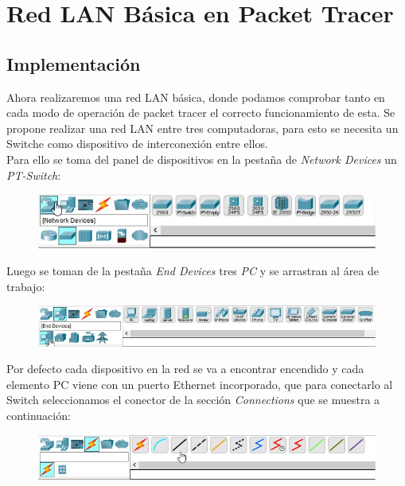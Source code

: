 \documentclass[journal]{IEEEtran}
\begin{document}
\section{Red LAN Básica en Packet Tracer}

\subsection{Implementación}
Ahora realizaremos una red LAN básica, donde podamos comprobar tanto en cada modo de operación de packet tracer el correcto funcionamiento de esta.
\newline
Se propone realizar una red LAN entre tres computadoras, para esto se necesita un Switche como dispositivo de interconexión entre ellos. \\
Para ello se toma del panel de dispositivos en la pestaña de \textit{Network Devices} un \textit{PT-Switch}:

\begin{figure}[ht]
	\centering
	\includegraphics[scale=0.4]{pt_switch.jpg}
\end{figure}

\newpage

Luego se toman de la pestaña \textit{End Devices} tres \textit{PC} y se arrastran al área de trabajo:

\begin{figure}[ht]
	\centering
	\includegraphics[scale=0.37]{pt_devices.jpg}
\end{figure}

Por defecto cada dispositivo en la red se va a encontrar encendido y cada elemento PC viene con un puerto Ethernet incorporado, que para conectarlo al Switch seleccionamos el conector de la sección \textit{Connections} que se muestra a continuación:

\begin{figure}[ht]
	\centering
	\includegraphics[scale=0.4]{pt_connections.jpg}
\end{figure}
\end{document}

